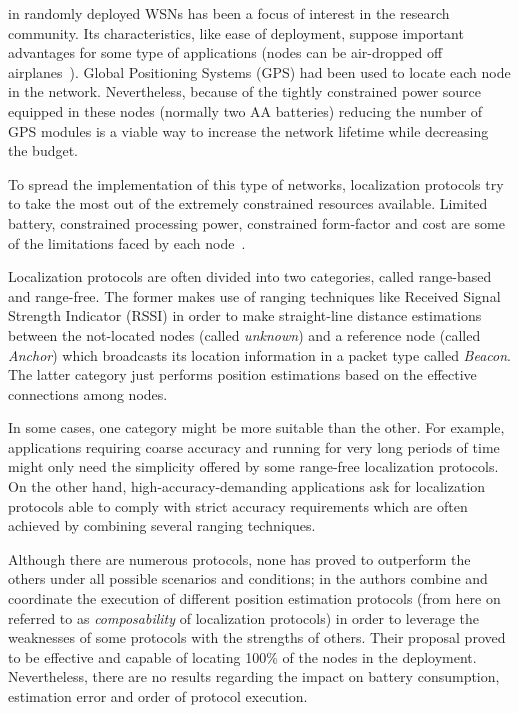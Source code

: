  in randomly deployed WSNs has been a focus of interest in the research community. Its characteristics, like ease of deployment, suppose important advantages for some type of applications (nodes can be air-dropped off airplanes~\cite{airDroppedVolvano}). Global Positioning Systems (GPS) had been used to locate each node in the network. Nevertheless, because of the tightly constrained power source equipped in these nodes (normally two AA batteries) reducing the number of GPS modules is a viable way to increase the network lifetime while decreasing the budget.

To spread the implementation of this type of networks, localization protocols try to take the most out of the extremely constrained resources available. Limited battery, constrained processing power, constrained form-factor and cost are some of the limitations faced by each node~\cite{AkyildizWSNs}.

Localization protocols are often divided into two categories, called range-based and range-free. The former makes use of ranging techniques like Received Signal Strength Indicator (RSSI) in order to make straight-line distance estimations between the not-located nodes (called \emph{unknown}) and a reference node (called \emph{Anchor}) which broadcasts its location information in a packet type called \emph{Beacon}. The latter category just performs position estimations based on the effective connections among nodes. 

In some cases, one category might be more suitable than the other. For example, applications requiring coarse accuracy and running for very long periods of time might only need the simplicity offered by some range-free localization protocols. On the other hand, high-accuracy-demanding applications ask for localization protocols able to comply with strict accuracy requirements which are often achieved by combining several ranging techniques.

Although there are numerous protocols, none has proved to outperform the others under all possible scenarios and conditions; in \cite{composability} the authors combine and coordinate the execution of different position estimation protocols (from here on referred to as \emph{composability} of localization protocols) in order to leverage the weaknesses of some protocols with the strengths of others. Their proposal proved to be effective and capable of locating 100\% of the nodes in the deployment. Nevertheless, there are no results regarding the impact on battery consumption, estimation error and order of protocol execution.

